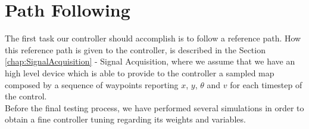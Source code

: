 \section{Path Following}
\label{chap:path_following}
The first task our controller should accomplish is to follow a reference path.
How this reference path is given to the controller, is described in the Section \ref{chap:SignalAcquisition} - Signal Acquisition, where we assume that we have an high level device which is able to provide to the controller a sampled map composed by a sequence of waypoints reporting $x$, $y$, $\theta$ and $v$ for each timestep of the control. \\Before the final testing process, we have performed several simulations in order to obtain a fine controller tuning regarding its weights and variables. 
